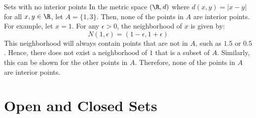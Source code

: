 \documentclass[openany]{book}
\begin{document}
\begin{example}{Sets with no interior points}
    In the metric space $(\R, d)$ where $d(x, y) = |x - y|$ for all $x, y \in \R$, let $A = \{1, 3\}$. Then, none of the points in $A$ are interior points. For example, let $x = 1$. For any $\epsilon > 0$, the neighborhood of $x$ is given by:
    $$N(1, \epsilon) = (1 - \epsilon, 1 + \epsilon)$$
    This neighborhood will always contain points that are not in $A$, such as $1.5$ or $0.5$. Hence, there does not exist a neighborhood of $1$ that is a subset of $A$. Similarly, this can be shown for the other points in $A$. Therefore, none of the points in $A$ are interior points.
\end{example}
\section{Open and Closed Sets}
\end{document}

